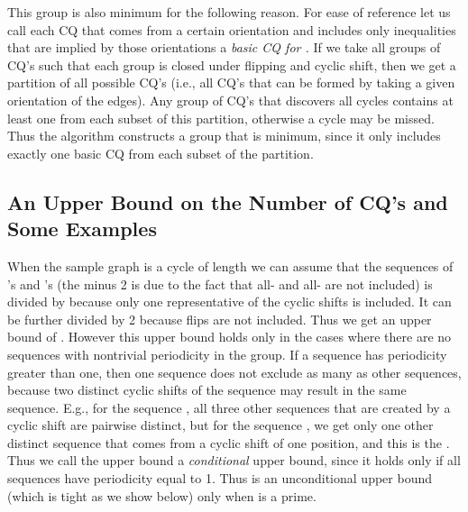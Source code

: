 This group is also minimum for the following reason.
For ease of reference let us call each CQ that comes from a certain orientation and includes only inequalities
that are implied by those orientations a {\em basic CQ for .}
If we take all groups of CQ's such that each group is closed
under flipping and cyclic shift, then we get a partition of all possible CQ's (i.e., all CQ's that can be formed
by taking a given orientation of the edges). Any group of CQ's that discovers all cycles
contains at least one from each subset of this partition, otherwise a cycle may be missed.
Thus the algorithm constructs a group that is minimum, since it only includes exactly one basic CQ from each subset of the partition.


\subsection{An Upper Bound on the Number of CQ's and Some Examples}

When the sample graph is a cycle of length
 we can assume that the  sequences of
's and 's (the minus 2 is due to the fact
that all- and all- are not included) is divided by 
because only one representative of the  cyclic shifts is included. It can be further divided by 2 because flips are
not included. Thus we get an upper bound of .
However this upper bound holds only in the cases
where there are no
sequences with nontrivial periodicity in the group.
If a sequence
has periodicity greater than one, then one sequence does not exclude as many as  other sequences,
because  two distinct cyclic shifts of the sequence may result in the same sequence.
E.g., for the sequence , all three other sequences that are created by a cyclic
shift are pairwise distinct, but for the sequence , we get only one other distinct
sequence that comes from a cyclic shift of one position, and this is the .
Thus we call the upper bound   a {\em conditional} upper
bound, since it holds only if all sequences have periodicity equal to 1.
Thus    is an unconditional
upper bound (which is tight as we show below)
only when  is a prime.

